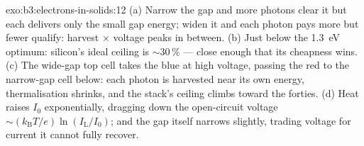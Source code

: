 \begin{solution}{exo:b3:electrons-in-solids:12}
(a) Narrow the gap and more photons clear it but each delivers
only the small gap energy; widen it and each photon pays more
but fewer qualify: harvest $\times$ voltage peaks in between.
(b) Just below the \qty{1.3}{eV} optimum: silicon's ideal
ceiling is $\sim30\,\%$ --- close enough that its cheapness wins.
(c) The wide-gap top cell takes the blue at high voltage, passing
the red to the narrow-gap cell below: each photon is harvested
near its own energy, thermalisation shrinks, and the stack's
ceiling climbs toward the forties. (d) Heat raises $I_0$
exponentially, dragging down the open-circuit voltage
$\sim(k_{\text{B}}T/e)\ln(I_{\text{L}}/I_0)$; and the gap itself
narrows slightly, trading voltage for current it cannot fully
recover.
\end{solution}

